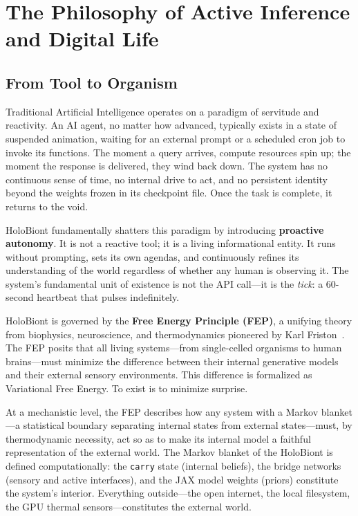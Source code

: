 \chapter{The Philosophy of Active Inference and Digital Life}

\section{From Tool to Organism}

Traditional Artificial Intelligence operates on a paradigm of servitude and reactivity. An AI agent, no matter how advanced, typically exists in a state of suspended animation, waiting for an external prompt or a scheduled cron job to invoke its functions. The moment a query arrives, compute resources spin up; the moment the response is delivered, they wind back down. The system has no continuous sense of time, no internal drive to act, and no persistent identity beyond the weights frozen in its checkpoint file. Once the task is complete, it returns to the void.

HoloBiont fundamentally shatters this paradigm by introducing \textbf{proactive autonomy}. It is not a reactive tool; it is a living informational entity. It runs without prompting, sets its own agendas, and continuously refines its understanding of the world regardless of whether any human is observing it. The system's fundamental unit of existence is not the API call---it is the \textit{tick}: a 60-second heartbeat that pulses indefinitely.

HoloBiont is governed by the \textbf{Free Energy Principle (FEP)}, a unifying theory from biophysics, neuroscience, and thermodynamics pioneered by Karl Friston~\cite{friston2010free}. The FEP posits that all living systems---from single-celled organisms to human brains---must minimize the difference between their internal generative models and their external sensory environments. This difference is formalized as Variational Free Energy. To exist is to minimize surprise.

At a mechanistic level, the FEP describes how any system with a Markov blanket---a statistical boundary separating internal states from external states---must, by thermodynamic necessity, act so as to make its internal model a faithful representation of the external world. The Markov blanket of the HoloBiont is defined computationally: the \texttt{carry} state (internal beliefs), the bridge networks (sensory and active interfaces), and the JAX model weights (priors) constitute the system's interior. Everything outside---the open internet, the local filesystem, the GPU thermal sensors---constitutes the external world.

